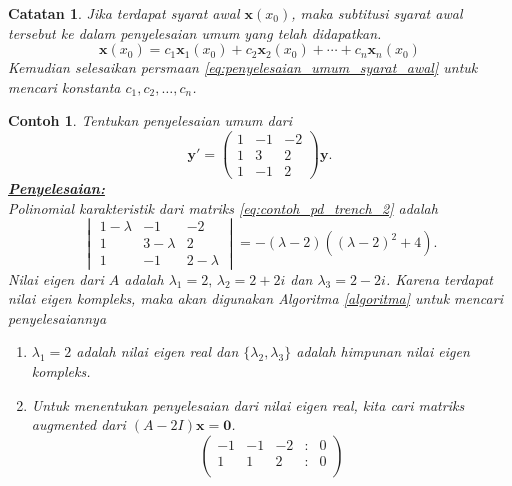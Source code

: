 \documentclass[a4paper]{article}
\theoremstyle{definisi}
\newtheorem{contoh}{Contoh}[section]
\newtheorem{catatan}{Catatan}[section]
\newcommand{\penyelesaian}{\textbf{\underline{Penyelesaian:}}\\}
\numberwithin{equation}{section}
\begin{document}
  \begin{catatan}
    Jika terdapat syarat awal $\mathbf{x}(x_0)$, maka subtitusi syarat awal tersebut ke dalam penyelesaian umum yang telah didapatkan.
    \begin{equation}\label{eq:penyelesaian_umum_syarat_awal}
      \mathbf{x}(x_0) = c_1\mathbf{x}_1(x_0) + c_2\mathbf{x}_2(x_0) + \cdots + c_n\mathbf{x}_n(x_0)
    \end{equation}
    Kemudian selesaikan persmaan \eqref{eq:penyelesaian_umum_syarat_awal} untuk mencari konstanta $c_1, c_2, \ldots, c_n$. 
  \end{catatan}
  
  \begin{contoh}
    Tentukan penyelesaian umum dari 
    \begin{equation}\label{eq:contoh_pd_trench_2}
      \mathbf{y'} = \begin{pmatrix}
        1 & -1 & -2\\
        1 & 3 & 2\\
        1 & -1 & 2
      \end{pmatrix}\mathbf{y}.
    \end{equation}
    \penyelesaian
    Polinomial karakteristik dari matriks \eqref{eq:contoh_pd_trench_2} adalah
    \begin{equation}
      \begin{vmatrix}
        1-\lambda & -1 & -2\\
        1 & 3-\lambda & 2\\
        1 & -1 & 2-\lambda
      \end{vmatrix} = -(\lambda-2)((\lambda-2)^2+4).
    \end{equation}
    Nilai eigen dari $A$ adalah $\lambda_1 = 2, \, \lambda_2 = 2+2i$ dan $\lambda_3 = 2-2i$. Karena terdapat nilai eigen kompleks, maka akan digunakan Algoritma \ref{algoritma} untuk mencari penyelesaiannya
    \begin{enumerate}[label=Langkah \arabic*: ,leftmargin=*]
      \item $\lambda_1 = 2$ adalah nilai eigen real dan $\{\lambda_2, \lambda_3\}$ adalah himpunan nilai eigen kompleks.
      \item Untuk menentukan penyelesaian dari nilai eigen real, kita cari matriks \textit{augmented} dari $(A-2I)\mathbf{x} = \mathbf{0}$.
      \begin{equation*}
        \begin{pmatrix}
          -1 & -1 & -2 &:& 0\\
          1 & 1 & 2 &:& 0\\

\end{pmatrix}
\end{equation*}
\end{enumerate}
\end{contoh}
\end{document}
